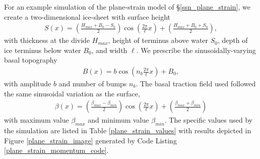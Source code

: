 For an example simulation of the plane-strain model of \S \ref{ssn_plane_strain}, we create a two-dimensional ice-sheet with surface height 
{\small
\begin{align*}
  S(x) = \left( \frac{ H_{max} + B_0 - S_0 }{2} \right) \cos\left( \frac{2\pi}{\ell} x \right) + \left( \frac{H_{max} + B_0 + S_0}{2} \right),
\end{align*}}
with thickness at the divide $H_{max}$, height of terminus above water $S_0$, depth of ice terminus below water $B_0$, and width $\ell$.  We prescribe the sinusoidally-varying basal topography
\begin{align*}
  B(x) = b \cos\left( n_b \frac{2\pi}{\ell} x \right) + B_0,
\end{align*}
with amplitude $b$ and number of bumps $n_b$.  The basal traction field used followed the same sinusoidal variation as the surface,
\begin{align*}
  \beta(x) = \left( \frac{\beta_{max} - \beta_{min}}{2} \right) \cos\left( \frac{2\pi}{\ell} x \right) + \left( \frac{\beta_{max} + \beta_{min}}{2} \right)
\end{align*}
with maximum value $\beta_{max}$ and minimum value $\beta_{min}$.  The specific values used by the simulation are listed in Table \ref{plane_strain_values} with results depicted in Figure \ref{plane_strain_image} generated by Code Listing \ref{plane_strain_momentum_code}.

